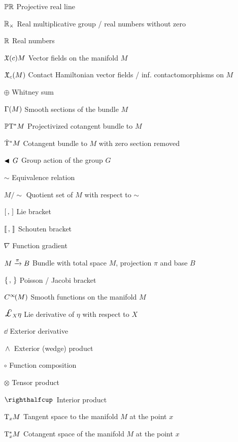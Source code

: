 \begin{itemize}[itemsep=0pt, leftmargin=2cm, labelsep=0cm, labelwidth=1.9cm, align=left]
%
    \item[$\mathbb{P}\mathbb{R}$] Projective real line
    \item[$\mathbb{R}_{\times}$] Real multiplicative group / real numbers without zero
    \item[$\mathbb{R}$] Real numbers
%
%
    \item[$\mathfrak{X}\qty(c){M}$]  Vector fields on the manifold $M$
    \item[$\mathfrak{X}_{c}\qty(M)$]  Contact Hamiltonian vector fields / inf. contactomorphisms on $M$
    \item[$\oplus$]  Whitney sum
    \item[$\mathrm{\Gamma}\qty(M)$]  Smooth sections of the bundle $M$ 
    \item[$\mathbb{P}\mathrm{T}^* M$]  Projectivized cotangent bundle to $M$
    \item[$\mathrm{\dot{T}}^*M$]  Cotangent bundle to $M$ with zero section removed
    \item[$\blacktriangleleft\,G$]  Group action of the group $G$
    \item[$\sim$]  Equivalence relation
    \item[$M / \sim$]  Quotient set of $M$ with respect to $\sim$
    \item[$\qty[\,,\,]$]  Lie bracket
    \item[$\llbracket\,,\,\rrbracket$]  Schouten bracket
    \item[$\nabla$]  Function gradient
    \item[$M\xrightarrow[]{\pi}B$]  Bundle with total space $M$, projection $\pi$ and base $B$
    \item[$\qty{\,,\,}$]  Poisson / Jacobi bracket
    \item[$C^\infty\!\qty(M)$]  Smooth functions on the manifold $M$
    \item[$\lied{X}{\eta}$]  Lie derivative of $\eta$ with respect to $X$
    \item[$\dd{}$]  Exterior derivative
    \item[$ \,\wedge\, $]  Exterior (wedge) product
    \item[$\circ$]  Function composition
    \item[$\otimes$]  Tensor product
    \item[$\intpr{}{}$]  Interior product
    \item[$\mathrm{T}_{x} M$]  Tangent space to the manifold $M$ at the point $x$
    \item[$\mathrm{T}_{x}^*M$]  Cotangent space of the manifold $M$ at the point $x$

\end{itemize}
